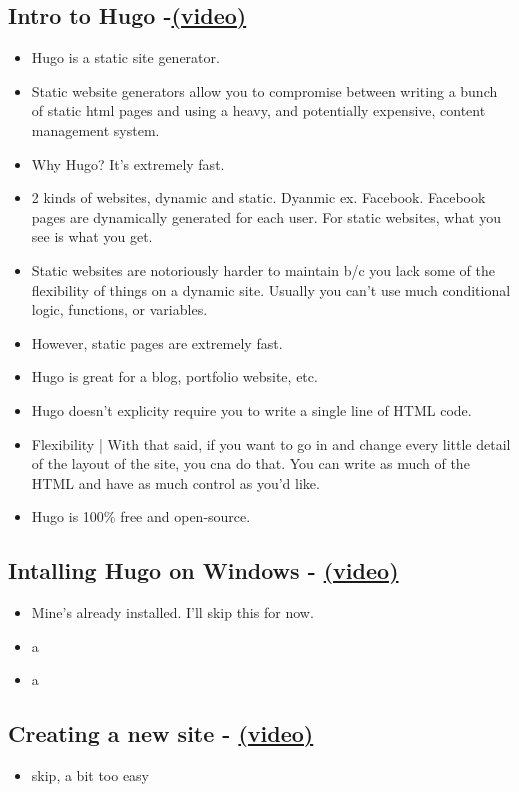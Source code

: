 \subsection{Intro to Hugo -\href{https://youtu.be/qtIqKaDlqXo}{(video)} }
\begin{itemize}
	\item
	Hugo is a static site generator.
	\item
	Static website generators allow you to compromise between writing a bunch of static html pages and using a heavy, and potentially expensive, content management system.
	\item
	Why Hugo? It's extremely fast.
	\item
	2 kinds of websites, dynamic and static. Dyanmic ex. Facebook. Facebook pages are dynamically generated for each user. For static websites, what you see is what you get.
	\item
	Static websites are notoriously harder to maintain b/c you lack some of the flexibility of things  on a dynamic site. Usually you can't use much conditional logic, functions, or variables.
	\item
	However, static pages are extremely fast.
	\item
	Hugo is great for a blog, portfolio website, etc.
	\item
	Hugo doesn't explicity require you to write a single line of HTML code.
	\item
	Flexibility | With that said, if you want to go in and change every little detail of the layout of the site, you cna do that. You can write as much of the HTML and have as much control as you'd like.
	\item
	Hugo is 100\% free and open-source.
\end{itemize}

\subsection{Intalling Hugo on Windows - \href{https://youtu.be/G7umPCU-8xc?list=PLLAZ4kZ9dFpOnyRlyS-liKL5ReHDcj4G3}{(video)} }
\begin{itemize}
	\item
	Mine's already installed. I'll skip this for now.
	\item
	a
	\item
	a
\end{itemize}

\subsection{Creating a new site - \href{https://youtu.be/sB0HLHjgQ7E?list=PLLAZ4kZ9dFpOnyRlyS-liKL5ReHDcj4G3}{(video)} }
\begin{itemize}
	\item skip, a bit too easy

\end{itemize}

